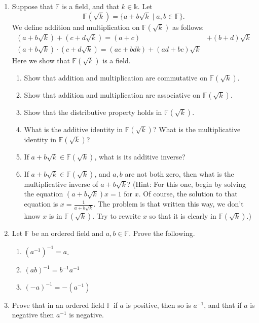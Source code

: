 \documentclass[11pt]{article}
\theoremstyle{definition}
\begin{document}
\begin{enumerate}
\item Suppose that $\mathbb{F}$ is a field, and that $k\in\mathbb{k}$. Let
  \[ \mathbb{F}(\sqrt{k}) = \{ a+b\sqrt{k} \mid a,b\in\mathbb{F} \}.\]
  We define addition and multiplication on $\mathbb{F}(\sqrt{k})$ as follows:
  \begin{align*}
    (a+b\sqrt{k}) + (c+d\sqrt{k}) = (a+c) &+ (b+d)\sqrt{k}\\
    (a+b\sqrt{k})\cdot (c+d\sqrt{k}) = (ac+bdk) + (ad+bc)\sqrt{k}
  \end{align*}
  Here we show that $\mathbb{F}(\sqrt{k})$ is a field.
  \begin{enumerate}
    \item Show that addition and multiplication are commutative on $\mathbb{F}(\sqrt{k})$.
    \item Show that addition and multiplication are associative on $\mathbb{F}(\sqrt{k})$.
    \item Show that the distributive property holds in $\mathbb{F}(\sqrt{k})$.
    \item What is the additive identity in $\mathbb{F}(\sqrt{k})$? What is the multiplicative identity in $\mathbb{F}(\sqrt{k})$?
    \item If $a+b\sqrt{k}\in\mathbb{F}(\sqrt{k})$, what is its additive inverse?
    \item If $a+b\sqrt{k}\in\mathbb{F}(\sqrt{k})$, and $a,b$ are not both zero, then what is the multiplicative inverse of $a+b\sqrt{k}$? 
      (Hint: For this one, begin by solving the equation $(a+b\sqrt{k})x=1$ for $x$. Of course, the solution to that equation is
      $x = \frac{1}{a+b\sqrt{k}}$. The problem is that written this way, we don't know $x$ is in $\mathbb{F}(\sqrt{k})$. Try to rewrite
      $x$ so that it is clearly in $\mathbb{F}(\sqrt{k})$.)
  \end{enumerate} \label{homework: quadratic extensions are fields}

  \item Let $\mathbb{F}$ be an ordered field and $a,b\in\mathbb{F}$. Prove the following.
    \begin{enumerate}
      \item $(a^{-1})^{-1} = a$.
      \item $(ab)^{-1} = b^{-1}a^{-1}$
      \item $(-a)^{-1} = -(a^{-1})$
    \end{enumerate}

  \item Prove that in an ordered field $\mathbb{F}$ if $a$ is positive, then so is $a^{-1}$, and that if $a$ is negative then $a^{-1}$ is negative. 


\end{enumerate}
\end{document}
